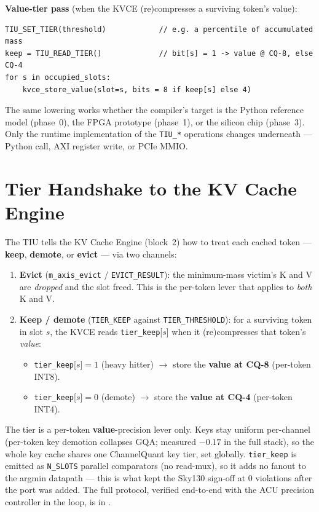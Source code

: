 \documentclass[11pt]{article}
\begin{document}
\textbf{Value-tier pass} (when the KVCE (re)compresses a surviving token's value):
\begin{lstlisting}[basicstyle=\ttfamily\small]
TIU_SET_TIER(threshold)            // e.g. a percentile of accumulated mass
keep = TIU_READ_TIER()             // bit[s] = 1 -> value @ CQ-8, else CQ-4
for s in occupied_slots:
    kvce_store_value(slot=s, bits = 8 if keep[s] else 4)
\end{lstlisting}

\noindent The same lowering works whether the compiler's target is the Python
reference model (phase~0), the FPGA prototype (phase~1), or the silicon chip
(phase~3). Only the runtime implementation of the \texttt{TIU\_*} operations
changes underneath --- Python call, AXI register write, or PCIe MMIO.

\section{Tier Handshake to the KV Cache Engine}
\label{sec:tier}

The TIU tells the KV Cache Engine (block~2) how to treat each cached token ---
\textbf{keep}, \textbf{demote}, or \textbf{evict} --- via two channels:

\begin{enumerate}
\item \textbf{Evict} (\texttt{m\_axis\_evict} / \texttt{EVICT\_RESULT}): the
  minimum-mass victim's K and V are \emph{dropped} and the slot freed. This is
  the per-token lever that applies to \emph{both} K and V.
\item \textbf{Keep / demote} (\texttt{TIER\_KEEP} against
  \texttt{TIER\_THRESHOLD}): for a surviving token in slot $s$, the KVCE reads
  \texttt{tier\_keep}[$s$] when it (re)compresses that token's \emph{value}:
  \begin{itemize}
  \item \texttt{tier\_keep}[$s$]$=1$ (heavy hitter) $\to$ store the \textbf{value
    at CQ-8} (per-token INT8).
  \item \texttt{tier\_keep}[$s$]$=0$ (demote) $\to$ store the \textbf{value at
    CQ-4} (per-token INT4).
  \end{itemize}
\end{enumerate}

\noindent The tier is a per-token \textbf{value}-precision lever only. Keys stay
uniform per-channel (per-token key demotion collapses GQA; measured $-0.17$ in
the full stack), so the whole key cache shares one ChannelQuant key tier, set
globally. \texttt{tier\_keep} is emitted as \texttt{N\_SLOTS} parallel
comparators (no read-mux), so it adds no fanout to the argmin datapath --- this is
what kept the Sky130 sign-off at 0 violations after the port was added. The full
protocol, verified end-to-end with the ACU precision controller in the loop, is in
.
\end{document}
